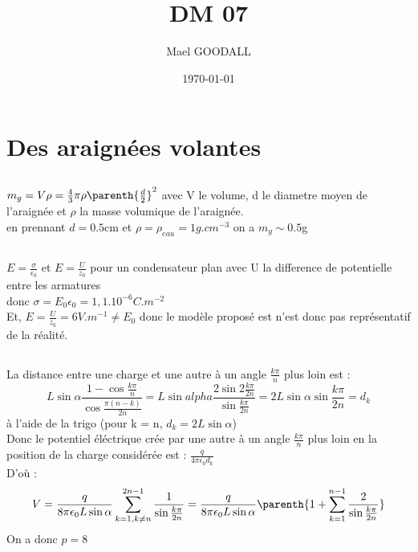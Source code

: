 \documentclass{math_style}
\title{DM 07}
\author{Mael GOODALL}
\date{\today}
\begin{document}
\maketitle
\tableofcontents

\section{Des araignées volantes}
    \subsection{}
	    $m_g=V\rho=\frac{4}{3}\pi \rho\parenth{\frac{d}{2}}^2$
	    avec V le volume, d le diametre moyen de l'araignée et $\rho$ la masse volumique de l'araignée.\\
	    en prennant $d=0.5$cm et $\rho=\rho_{eau}=1g.cm^{-3}$
	    on a \underline{$m_g\sim0.5$g}
    \subsection{}
	    $E=\frac{\sigma}{\epsilon_0}$ et
	    $E=\frac{U}{z_0}$
	    pour un condensateur plan avec U la difference de potentielle entre les armatures\\
	    donc \underline{$\sigma = E_0 \epsilon_0$}$=1,1.10^{-6}C.m^{-2}$\\
	    Et, $E=\frac{U}{z_0}=6V.m^{-1}\neq E_0$
	    donc le modèle proposé est n'est donc pas représentatif de la réalité.
    \subsection{}
	    La distance entre une charge et une autre à un angle $\frac{k\pi}{n}$ plus loin
	    est : \[L\sin{\alpha} \frac{1-\cos{\frac{k\pi}{n}}}{\cos{\frac{\pi(n-k)}{2n}}}
		    =L\sin{alpha} \frac{2\sin2{\frac{k\pi}{2n}}}{\sin{\frac{k\pi}{2n}}}
		    =2L\sin{\alpha}\sin{\frac{k\pi}{2n}}=d_k \] à l'aide de la trigo (pour k = n, $d_k=2L\sin{\alpha}$)\\
	    Donc le potentiel éléctrique crée par une autre à un angle $\frac{k\pi}{n}$ plus loin
	    en la position de la charge considérée est : $\frac{q}{4\pi\epsilon_0 d_k}$\\
	    D'où :
	    \[V =\frac{q}{8\pi\epsilon_0 L\sin{\alpha}}\sum^{2n-1}_{k=1, k\neq n}\frac{1}{\sin{\frac{k\pi}{2n}}}
		    =\frac{q}{8\pi\epsilon_0 L\sin{\alpha}}\parenth{1 + \sum^{n-1}_{k=1}\frac{2}{\sin{\frac{k\pi}{2n}}}}\]
	    On a donc $p=8$


	    
\end{document}
